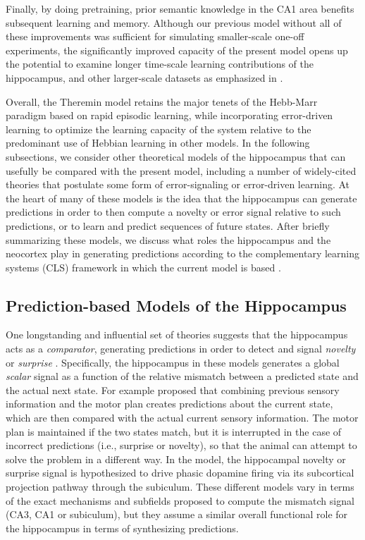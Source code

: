\documentclass[11pt,twoside]{article}
\newif\myifpdf
\begin{document}
Finally, by doing pretraining, prior semantic knowledge in the CA1 area benefits subsequent learning and memory.  Although our previous model without all of these improvements was sufficient for simulating smaller-scale one-off experiments, the significantly improved capacity of the present model opens up the potential to examine longer time-scale learning contributions of the hippocampus, and other larger-scale datasets as emphasized in \citet{KowadloAhmedRawlinson20}.

Overall, the Theremin model retains the major tenets of the Hebb-Marr paradigm based on rapid episodic learning, while incorporating error-driven learning to optimize the learning capacity of the system relative to the predominant use of Hebbian learning in other models.  In the following subsections, we consider other theoretical models of the hippocampus that can usefully be compared with the present model, including a number of widely-cited theories that postulate some form of error-signaling or error-driven learning.  At the heart of many of these models is the idea that the hippocampus can generate predictions in order to then compute a novelty or error signal relative to such predictions, or to learn and predict sequences of future states. After briefly summarizing these models, we discuss what roles the hippocampus and the neocortex play in generating predictions according to the complementary learning systems (CLS) framework in which the current model is based \citep{McClellandMcNaughtonOReilly95,OReillyBhattacharyyaHowardEtAl14,OReillyRanganathRussin21}.  

\subsection{Prediction-based Models of the Hippocampus}

One longstanding and influential set of theories suggests that the hippocampus acts as a \emph{comparator}, generating predictions in order to detect and signal \emph{novelty} or \emph{surprise} \citep{Gray82,Vinogradova01,LismanGrace05}.  Specifically, the hippocampus in these models generates a global \emph{scalar} signal as a function of the relative mismatch between a predicted state and the actual next state.  For example \citet{Gray82} proposed that combining previous sensory information and the motor plan creates predictions about the current state, which are then compared with the actual current sensory information.  The motor plan is maintained if the two states match, but it is interrupted in the case of incorrect predictions (i.e., surprise or novelty), so that the animal can attempt to solve the problem in a different way.  In the \citet{LismanGrace05} model, the hippocampal novelty or surprise signal is hypothesized to drive phasic dopamine firing via its subcortical projection pathway through the subiculum. These different models vary in terms of the exact mechanisms and subfields proposed to compute the mismatch signal (CA3, CA1 or subiculum), but they assume a similar overall functional role for the hippocampus in terms of synthesizing predictions. 
\end{document}

